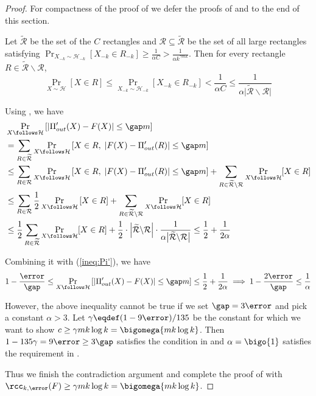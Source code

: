 \begin{proof}
		For compactness of the proof of  we defer the proofs of  and   to the end of this section.

		Let $\widetilde{\mathcal{R}}$ be the set of the $C$ rectangles and $\mathcal{R}\subseteq\widetilde{\mathcal{R}}$ be the set of all large rectangles satisfying $\Pr_{X_{-k} \sim \mathcal{H}_{-k}}[X_{-k}\in R_{-k}]\ge \frac{1}{\alpha C}>\frac{1}{\alpha k^{\gamma mk}}$.
		Then for every rectangle $R\in \widetilde{\mathcal{R}}\backslash\mathcal{R}$, 
		\[\Pr_{X \sim \mathcal{H}}[X\in R]\le  \Pr_{X_{-k} \sim \mathcal{H}_{-k}}[X_{-k}\in R_{-k}]< \frac{1}{\alpha C} \le \frac{1}{\alpha \big|\widetilde{\mathcal{R}}\backslash\mathcal{R}
		\big|} \]

		Using , we have
		\begin{align*}
			&\Pr_{X\follows \mathcal{H}}\left[ \left| \Pi'_{out}(X) - F(X)\right| \le \gap m \right]	\\
			&=  \sum_{R\in \widetilde{\mathcal{R}}} %
			\Pr_{X\follows \mathcal{H}}\left[  X\in R,\; \left|F(X)-\Pi'_{out}(R)\right|\le \gap m \right] \\
			&\le  \sum_{R\in {\mathcal{R}}} %
			\Pr_{X\follows \mathcal{H}}\left[  X\in R,\; \left|F(X)-\Pi'_{out}(R)\right|\le \gap m \right] 
			+ \sum_{R\in \widetilde{\mathcal{R}}\backslash\mathcal{R}} \Pr_{X\follows \mathcal{H}}[X\in R] \\
			&\le \sum_{R\in {\mathcal{R}}}  \frac{1}{2} \Pr_{X\follows \mathcal{H}}\left[ X\in R\right]
			+ \sum_{R\in \widetilde{\mathcal{R}}\backslash\mathcal{R}} \Pr_{X\follows \mathcal{H}}[X\in R] \\
			&\le \frac{1}{2} \sum_{R\in \widetilde{\mathcal{R}}} \Pr_{X\follows \mathcal{H}}[X\in R] +\frac{1}{2} \cdot \left| \widetilde{\mathcal{R}}\backslash\mathcal{R}\right|\cdot \frac{1}{\alpha \big|\widetilde{\mathcal{R}}\backslash\mathcal{R}
		\big|}
			\le \frac{1}{2}+\frac{1}{2\alpha}
		\end{align*}	

Combining it with (\ref{ineq:Pi'}), %
%
%
we have 
	\[1-\frac{\error}{\gap} \le \Pr_{X\follows \mathcal{H}}\left[ \left| \Pi'_{out}(X) - F(X)\right| \le \gap m \right] \le \frac{1}{2}+\frac{1}{2\alpha}  
	\implies 1-\frac{2\error}{\gap}\le \frac{1}{\alpha}\]
	
	However, the above inequality cannot be true if we set $\gap =3\error$ and pick a constant $\alpha>3$.
	Let $\gamma\eqdef (1-9\error)/135$ be the constant for which we want to show $c\ge \gamma mk\log k= \bigomega{m k \log k}$.
	Then $1-135\gamma = 9\error \ge 3\gap$ satisfies the condition in  and $\alpha=\bigo{1}$ satisfies the requirement in .



	Thus we finish the contradiction argument and complete the proof of  with $\rcc_{k,\error}(F)\ge  \gamma mk\log k =\bigomega{m k\log k}$. 
	\end{proof}




